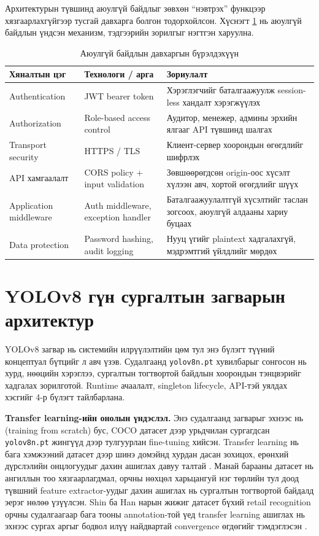 Архитектурын түвшинд аюулгүй байдлыг зөвхөн ``нэвтрэх'' функцээр хязгаарлахгүйгээр тусгай давхарга болгон тодорхойлсон. Хүснэгт \ref{tab:security_layers} нь аюулгүй байдлын үндсэн механизм, тэдгээрийн зорилгыг нэгтгэн харуулна.

\begin{longtable}{|p{3cm}|p{4cm}|p{5.2cm}|}
\caption{Аюулгүй байдлын давхаргын бүрэлдэхүүн}
\label{tab:security_layers} \\
\hline
\textbf{Хяналтын цэг} & \textbf{Технологи / арга} & \textbf{Зориулалт} \\
\hline
Authentication & JWT bearer token & Хэрэглэгчийг баталгаажуулж session-less хандалт хэрэгжүүлэх \\
\hline
Authorization & Role-based access control & Аудитор, менежер, админы эрхийн ялгааг API түвшинд шалгах \\
\hline
Transport security & HTTPS / TLS & Клиент-сервер хоорондын өгөгдлийг шифрлэх \\
\hline
API хамгаалалт & CORS policy + input validation & Зөвшөөрөгдсөн origin-оос хүсэлт хүлээн авч, хортой өгөгдлийг шүүх \\
\hline
Application middleware & Auth middleware, exception handler & Баталгаажуулалтгүй хүсэлтийг таслан зогсоох, аюулгүй алдааны хариу буцаах \\
\hline
Data protection & Password hashing, audit logging & Нууц үгийг plaintext хадгалахгүй, мэдрэмтгий үйлдлийг мөрдөх \\
\hline
\end{longtable}

\section{YOLOv8 гүн сургалтын загварын архитектур}

YOLOv8 загвар нь системийн илрүүлэлтийн цөм тул энэ бүлэгт түүний концептуал бүтцийг л авч үзэв. Судалгаанд \texttt{yolov8n.pt} хувилбарыг сонгосон нь хурд, нөөцийн хэрэглээ, сургалтын тогтвортой байдлын хоорондын тэнцвэрийг хадгалах зорилготой. Runtime ачаалалт, singleton lifecycle, API-тэй уялдах хэсгийг 4-р бүлэгт тайлбарлана.

\textbf{Transfer learning-ийн онолын үндэслэл.} Энэ судалгаанд загварыг эхнээс нь (training from scratch) бус, COCO датасет дээр урьдчилан сургагдсан \texttt{yolov8n.pt} жингүүд дээр тулгуурлан fine-tuning хийсэн. Transfer learning нь бага хэмжээний датасет дээр шинэ домэйнд хурдан дасан зохицох, ерөнхий дүрслэлийн онцлогуудыг дахин ашиглах давуу талтай \cite{transfer_learning}. Манай барааны датасет нь ангиллын тоо хязгаарлагдмал, орчны нөхцөл харьцангуй нэг төрлийн тул доод түвшний feature extractor-уудыг дахин ашиглах нь сургалтын тогтвортой байдалд эерэг нөлөө үзүүлсэн. Shin ба Han нарын жижиг датасет бүхий retail recognition орчны судалгаагаар бага тооны annotation-той үед transfer learning ашиглах нь эхнээс сургах аргыг бодвол илүү найдвартай convergence өгдөгийг тэмдэглэсэн \cite{shin_han_transfer}.


